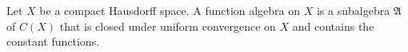 
Let $X$ be a compact Hausdorff space. A function algebra on $X$ is a subalgebra $\mathfrak{A}$ of $C(X)$ that is closed under uniform convergence on $X$ and contains the constant functions.
